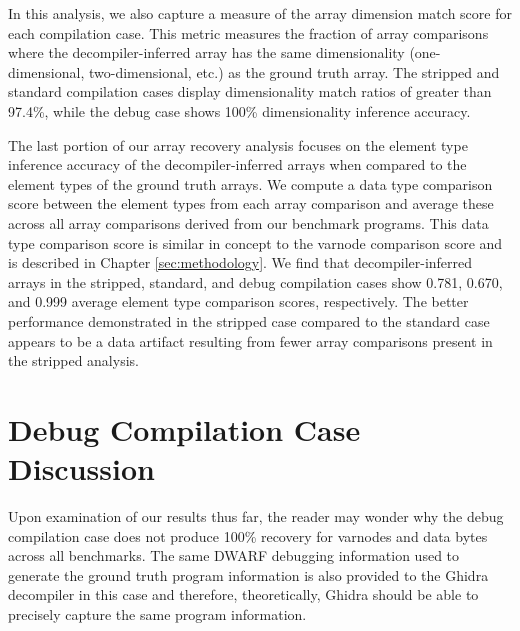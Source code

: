 In this analysis, we also capture a measure of the array dimension match score for each compilation case. This metric measures the fraction of array comparisons where the decompiler-inferred array has the same dimensionality (one-dimensional, two-dimensional, etc.) as the ground truth array. The stripped and standard compilation cases display dimensionality match ratios of greater than 97.4\%, while the debug case shows 100\% dimensionality inference accuracy.

The last portion of our array recovery analysis focuses on the element type inference accuracy of the decompiler-inferred arrays when compared to the element types of the ground truth arrays. We compute a data type comparison score between the element types from each array comparison and average these across all array comparisons derived from our benchmark programs. This data type comparison score is similar in concept to the varnode comparison score and is described in Chapter \ref{sec:methodology}. We find that decompiler-inferred arrays in the stripped, standard, and debug compilation cases show 0.781, 0.670, and 0.999 average element type comparison scores, respectively. The better performance demonstrated in the stripped case compared to the standard case appears to be a data artifact resulting from fewer array comparisons present in the stripped analysis.

\section{Debug Compilation Case Discussion}

Upon examination of our results thus far, the reader may wonder why the debug compilation case does not produce 100\% recovery for varnodes and data bytes across all benchmarks. The same DWARF debugging information used to generate the ground truth program information is also provided to the Ghidra decompiler in this case and therefore, theoretically, Ghidra should be able to precisely capture the same program information.


